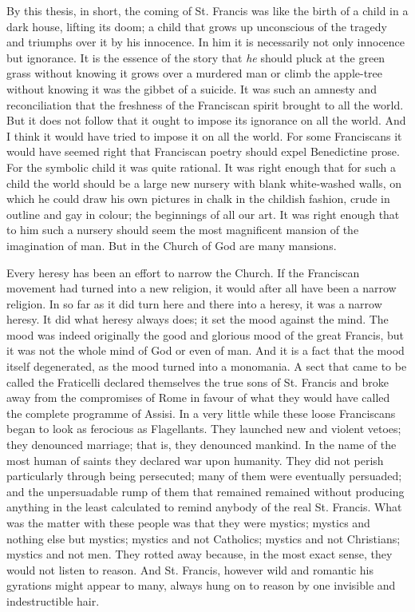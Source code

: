 \documentclass{book}
\begin{document}
By this thesis, in short, the coming of St. Francis was like the birth of a child in a dark house, lifting its doom; a child that grows up unconscious of the tragedy and triumphs over it by his innocence. In him it is necessarily not only innocence but ignorance. It is the essence of the story that \emph{he} should pluck at the green grass without knowing it grows over a murdered man or climb the apple-tree without knowing it was the gibbet of a suicide. It was such an amnesty and reconciliation that the freshness of the Franciscan spirit brought to all the world. But it does not follow that it ought to impose its ignorance on all the world. And I think it would have tried to impose it on all the world. For some Franciscans it would have seemed right that Franciscan poetry should expel Benedictine prose. For the symbolic child it was quite rational. It was right enough that for such a child the world should be a large new nursery with blank white-washed walls, on which he could draw his own pictures in chalk in the childish fashion, crude in outline and gay in colour; the beginnings of all our art. It was right enough that to him such a nursery should seem the most magnificent mansion of the imagination of man. But in the Church of God are many mansions.

Every heresy has been an effort to narrow the Church. If the Franciscan movement had turned into a new religion, it would after all have been a narrow religion. In so far as it did turn here and there into a heresy, it was a narrow heresy. It did what heresy always does; it set the mood against the mind. The mood was indeed originally the good and glorious mood of the great Francis, but it was not the whole mind of God or even of man. And it is a fact that the mood itself degenerated, as the mood turned into a monomania. A sect that came to be called the Fraticelli declared themselves the true sons of St. Francis and broke away from the compromises of Rome in favour of what they would have called the complete programme of Assisi. In a very little while these loose Franciscans began to look as ferocious as Flagellants. They launched new and violent vetoes; they denounced marriage; that is, they denounced mankind. In the name of the most human of saints they declared war upon humanity. They did not perish particularly through being persecuted; many of them were eventually persuaded; and the unpersuadable rump of them that remained remained without producing anything in the least calculated to remind anybody of the real St. Francis. What was the matter with these people was that they were mystics; mystics and nothing else but mystics; mystics and not Catholics; mystics and not Christians; mystics and not men. They rotted away because, in the most exact sense, they would not listen to reason. And St. Francis, however wild and romantic his gyrations might appear to many, always hung on to reason by one invisible and indestructible hair.
\end{document}
